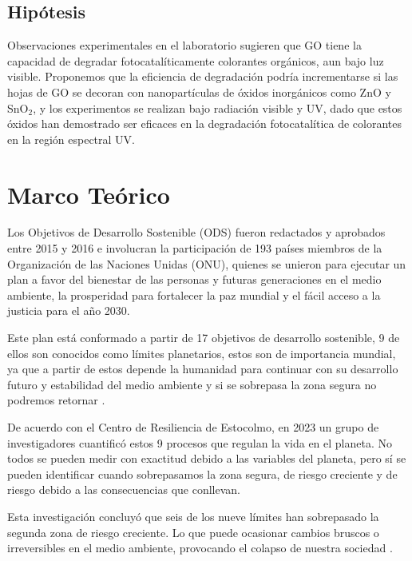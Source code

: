 \documentclass[12pt]{article}
\begin{document}
\subsection{Hipótesis}
Observaciones experimentales en el laboratorio sugieren que GO tiene la capacidad de degradar fotocatalíticamente colorantes orgánicos, aun bajo luz visible. Proponemos que la eficiencia de degradación podría incrementarse si las hojas de GO se decoran con nanopartículas de óxidos inorgánicos como ZnO y SnO$\displaystyle _{2}$, y los experimentos se realizan bajo radiación visible y UV, dado que estos óxidos han demostrado ser eficaces en la degradación fotocatalítica de colorantes en la región espectral UV.






\newpage
\section{Marco Teórico}
Los Objetivos de Desarrollo Sostenible (ODS) fueron redactados y aprobados entre 2015 y 2016  e involucran la participación de 193 países miembros de la Organización de las Naciones Unidas (ONU), quienes se unieron para ejecutar un plan a favor del bienestar de las personas y futuras generaciones en el medio ambiente, la prosperidad para fortalecer la paz mundial y el fácil acceso a la justicia para el año 2030\cite{IEEEreferencias:Ref1}.
\vspace{1em} %

Este plan está conformado a partir de 17 objetivos de desarrollo sostenible, 9 de ellos son conocidos como límites planetarios, estos son de importancia mundial, ya que a partir de estos depende la humanidad para continuar con su desarrollo futuro y estabilidad del medio ambiente y si se sobrepasa la zona segura no podremos retornar \cite{IEEEreferencias:Ref2}.
\vspace{1em} %

De acuerdo con el Centro de Resiliencia de Estocolmo, en 2023 un grupo de investigadores cuantificó estos 9 procesos que regulan la vida en el planeta. No todos se pueden medir con exactitud debido a las variables del planeta, pero sí se pueden identificar cuando sobrepasamos la zona segura, de riesgo creciente y de riesgo debido a las consecuencias que conllevan.\vspace{1em} %

Esta investigación concluyó que seis de los nueve límites han sobrepasado la segunda zona de riesgo creciente. Lo que puede ocasionar cambios bruscos o irreversibles en el medio ambiente, provocando el colapso de nuestra sociedad \cite{IEEEreferencias:Ref3}.
\vspace{1em} %
\end{document}
